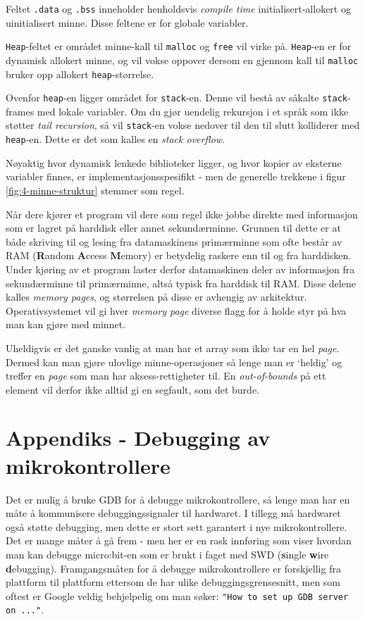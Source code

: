 Feltet \verb|.data| og \verb|.bss| inneholder henholdsvis \textit{compile time} initialisert-allokert og uinitialisert minne. Disse feltene er for globale variabler.

\verb|Heap|-feltet er området minne-kall til \verb|malloc| og \verb|free| vil virke på. \verb|Heap|-en er for dynamisk allokert minne, og vil vokse oppover dersom en gjennom kall til \verb|malloc| bruker opp allokert \verb|heap|-størrelse.

Ovenfor \verb|heap|-en ligger området for \verb|stack|-en. Denne vil bestå av såkalte \verb|stack|-frames med lokale variabler. Om du gjør uendelig rekursjon i et språk som ikke støtter \textit{tail recursion}, så vil \verb|stack|-en vokse nedover til den til slutt kolliderer med \verb|heap|-en. Dette er det som kalles en \textit{stack overflow}.

Nøyaktig hvor dynamisk lenkede biblioteker ligger, og hvor kopier av eksterne variabler finnes, er implementasjonsspesifikt - men de generelle trekkene i figur \ref{fig:4-minne-struktur} stemmer som regel.

Når dere kjører et program vil dere som regel ikke jobbe direkte med informasjon som er lagret på harddisk eller annet sekundærminne. Grunnen til dette er at både skriving til og lesing fra datamaskinens primærminne som ofte består av RAM (\textbf{R}andom \textbf{A}ccess \textbf{M}emory) er betydelig raskere enn til og fra harddisken. Under kjøring av et program laster derfor datamaskinen deler av informasjon fra sekundærminne til primærminne, altså typisk fra harddisk til RAM. Disse delene kalles \textit{memory pages}, og størrelsen på disse er avhengig av arkitektur. Operativsystemet vil gi hver \textit{memory page} diverse flagg for å holde styr på hva man kan gjøre med minnet.

Uheldigvis er det ganske vanlig at man har et array som ikke tar en hel \textit{page}. Dermed kan man gjøre ulovlige minne-operasjoner så lenge man er `heldig' og treffer en \textit{page} som man har aksess-rettigheter til. En \textit{out-of-bounds} på ett element vil derfor ikke alltid gi en segfault, som det burde.

\section{Appendiks - Debugging av mikrokontrollere}\label{app:debugg-micro}
Det er mulig å bruke GDB for å debugge mikrokontrollere, så lenge man har en måte å kommunisere debuggingssignaler til hardwaret. I tillegg må hardwaret også støtte debugging, men dette er stort sett garantert i nye mikrokontrollere. Det er mange måter å gå frem - men her er en rask innføring som viser hvordan man kan debugge micro:bit-en som er brukt i faget med SWD (\textbf{s}ingle \textbf{w}ire \textbf{d}ebugging). Framgangsmåten for å debugge mikrokontrollere er forskjellig fra plattform til plattform ettersom de har ulike debuggingsgrensesnitt, men som oftest er Google veldig behjelpelig om  man søker: \verb|"How to set up GDB server on ..."|.

